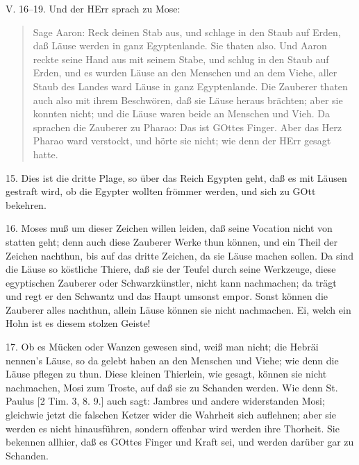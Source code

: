 \begin{schriftzitat}
V. 16–19. Und der HErr sprach zu Mose:
\end{schriftzitat}

\begin{quote}
Sage Aaron: Reck deinen Stab aus, und schlage in den Staub auf Erden, daß Läuse werden in ganz Egyptenlande. Sie thaten also. Und Aaron reckte seine Hand aus mit seinem Stabe, und schlug in den Staub auf Erden, und es wurden Läuse an den Menschen und an dem Viehe, aller Staub des Landes ward Läuse in ganz Egyptenlande. Die Zauberer thaten auch also mit ihrem Beschwören, daß sie Läuse heraus brächten; aber sie konnten nicht; und die Läuse waren beide an Menschen und Vieh. Da sprachen die Zauberer zu Pharao: Das ist GOttes Finger. Aber das Herz Pharao ward verstockt, und hörte sie nicht; wie denn der HErr gesagt hatte.
\end{quote}

15. Dies ist die dritte Plage, so über das Reich Egypten geht, daß es mit Läusen gestraft wird, ob die Egypter wollten frömmer werden, und sich zu GOtt bekehren.

16. Moses muß um dieser Zeichen willen leiden, daß seine Vocation nicht von statten geht; denn auch diese Zauberer Werke thun können, und ein Theil der Zeichen nachthun, bis auf das dritte Zeichen, da sie Läuse machen sollen. Da sind die Läuse so köstliche Thiere, daß sie der Teufel durch seine Werkzeuge, diese egyptischen Zauberer oder Schwarzkünstler, nicht kann nachmachen; da trägt und regt er den Schwantz und das Haupt umsonst empor. Sonst können die Zauberer alles nachthun, allein Läuse können sie nicht nachmachen. Ei, welch ein Hohn ist es diesem stolzen Geiste!

17. Ob es Mücken oder Wanzen gewesen sind, weiß man nicht; die Hebräi nennen’s Läuse, so da gelebt haben an den Menschen und Viehe; wie denn die Läuse pflegen zu thun. Diese kleinen Thierlein, wie gesagt, können sie nicht nachmachen, Mosi zum Troste, auf daß sie zu Schanden werden. Wie denn St. Paulus [2 Tim. 3, 8. 9.] auch sagt: Jambres und andere widerstanden Mosi; gleichwie jetzt die falschen Ketzer wider die Wahrheit sich auflehnen; aber sie werden es nicht hinausführen, sondern offenbar wird werden ihre Thorheit. Sie bekennen allhier, daß es GOttes Finger und Kraft sei, und werden darüber gar zu Schanden.

